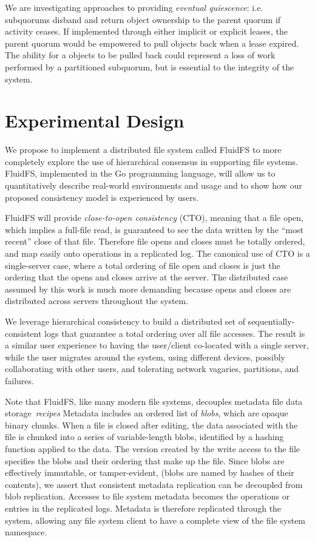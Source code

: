 \documentclass[sigconf]{acmart}
\begin{document}
We are investigating approaches to providing \emph{eventual quiescence}: i.e.
subquorums disband and return object ownership to the parent quorum if activity ceases.
If implemented through either implicit or explicit leases,
the parent quorum would be empowered to pull objects back when a lease expired.
The ability for a objects to be pulled back could represent a loss of work performed by a
partitioned subquorum, but is essential to the integrity of the system.

\section{Experimental Design}

We propose to implement a distributed file system called FluidFS to more completely explore
the use of hierarchical consensus in supporting file systems.
FluidFS, implemented in the Go programming language, will allow us to quantitatively
describe real-world environments and usage and to show how our proposed consistency
model is experienced by users.

FluidFS will provide \emph{close-to-open consistency} (CTO), meaning that a file
open, which implies a full-file read, is guaranteed to see the data written by the ``most recent'' close of
that file.
Therefore file opens and closes must be totally ordered, and map
easily onto operations in a replicated log.
The canonical use of CTO is a single-server case, where a total
ordering of file open and closes is just the ordering that the opens
and closes arrive at the server.
The distributed case assumed by this work is much more demanding because
opens and closes are distributed across servers throughout the system.

We leverage hierarchical consistency to build a distributed set of sequentially-consistent logs
that guarantee a total ordering over all file accesses.
The result is a similar user experience to having the user/client co-located with a single
server, while the user migrates around the system, using different devices, possibly
collaborating with other users, and tolerating network vagaries, partitions, and failures.

Note that FluidFS, like many modern file systems,
decouples metadata file
data storage~\emph{recipes}
Metadata includes an ordered list of \emph{blobs}, which are opaque binary chunks.
When a file is closed after editing, the data associated with the file is chunked into a
series of variable-length blobs, identified by a hashing function applied to
the data.
The version created by the write access to the file specifies the blobs and their ordering
that make up the file.
Since blobs are effectively immutable, or tamper-evident, (blobs are named by hashes of
their contents), we assert that consistent metadata replication can be decoupled from blob
replication.
Accesses to file system metadata becomes the operations or entries in the replicated logs.
Metadata is therefore replicated through the system, allowing any file
system client to have a complete view of the file system namespace.
\end{document}
